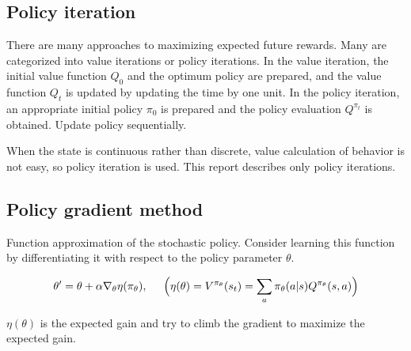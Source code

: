 \subsection{Policy iteration}

There are many approaches to maximizing expected future rewards. Many are categorized into value iterations or policy iterations.
In the value iteration, the initial value function $Q_0$ and the optimum policy are prepared, and the value function $Q_t$ is updated by updating the time by one unit. In the policy iteration, an appropriate initial policy $\pi_0$ is prepared and the policy evaluation $Q^{\pi_t}$ is obtained. Update policy sequentially.

When the state is continuous rather than discrete, value calculation of behavior is not easy, so policy iteration is used. This report describes only policy iterations.


\subsection{Policy gradient method}

Function approximation of the stochastic policy.
Consider learning this function by differentiating it with respect to the policy parameter $\theta$.

\[
\theta' = \theta + \alpha \nabla_{\theta}\eta(\pi_\theta) , \hspace{5mm}
\Bigl( \eta(\theta) = V^{\pi_\theta}(s_t) = \sum_a \pi_\theta (a|s) Q^{\pi_\theta}(s,a) \Bigr)
\]

$\eta(\theta)$ is the expected gain and try to climb the gradient to maximize the expected gain.

